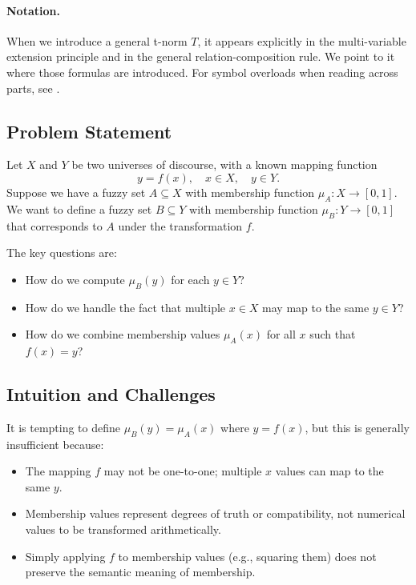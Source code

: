 \paragraph{Notation.} When we introduce a general t\hyp{}norm \(T\), it appears explicitly in the multi\hyp{}variable extension principle and in the general relation\hyp{}composition rule. We point to it where those formulas are introduced. For symbol overloads when reading across parts, see .


\subsection{Problem Statement}
\label{sec:fuzzyrelations_problem_statement}

Let \( X \) and \( Y \) be two universes of discourse, with a known mapping function
\[
y = f(x), \quad x \in X, \quad y \in Y.
\]
Suppose we have a fuzzy set \( A \subseteq X \) with membership function \(\mu_A: X \to [0,1]\). We want to define a fuzzy set \( B \subseteq Y \) with membership function \(\mu_B: Y \to [0,1]\) that corresponds to \( A \) under the transformation \( f \).

The key questions are:
\begin{itemize}
    \item How do we compute \(\mu_B(y)\) for each \( y \in Y \)?
    \item How do we handle the fact that multiple \( x \in X \) may map to the same \( y \in Y \)?
    \item How do we combine membership values \(\mu_A(x)\) for all \( x \) such that \( f(x) = y \)?
\end{itemize}

\subsection{Intuition and Challenges}
\label{sec:fuzzyrelations_intuition_and_challenges}

It is tempting to define \(\mu_B(y) = \mu_A(x)\) where \( y = f(x) \), but this is generally insufficient because:

\begin{itemize}
    \item The mapping \( f \) may not be one-to-one; multiple \( x \) values can map to the same \( y \).
    \item Membership values represent degrees of truth or compatibility, not numerical values to be transformed arithmetically.
    \item Simply applying \( f \) to membership values (e.g., squaring them) does not preserve the semantic meaning of membership.
\end{itemize}

